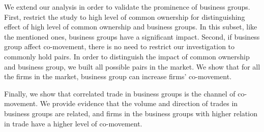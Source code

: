 	
	
	We extend our analysis in order to validate the prominence of business groups. First, restrict the study to high level of common ownership for distinguishing effect of high level of common ownership and business groups. 
	In this subset, like the mentioned ones, business groups have a significant impact.
	Second, if business group affect co-movement, there is no need to restrict our investigation to commonly hold pairs. In order to distinguish the impact of common ownership and business group, we built all possible pairs in the market.
	We show that for all the firms in the market, business group can increase firms' co-movement. 
	
	Finally, we show that correlated trade in business groups is the channel of co-movement. We provide evidence that the volume and direction of trades in business groups are related, and firms in the business groups with higher relation in trade have a higher level of co-movement.
	
	
	

%